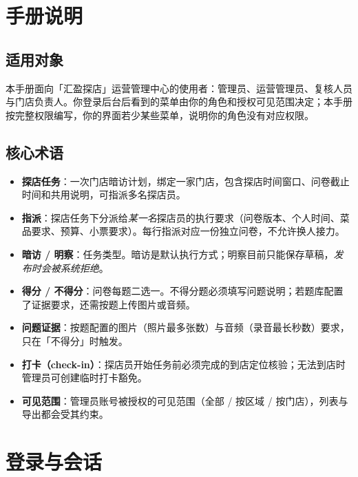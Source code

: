 \documentclass[12pt,a4paper,fontset=none]{ctexart}
\begin{document}

\tableofcontents
\newpage

\section{手册说明}

\subsection{适用对象}
本手册面向「汇盈探店」运营管理中心的使用者：管理员、运营管理员、复核人员与门店负责人。你登录后台后看到的菜单由你的角色和授权可见范围决定；本手册按完整权限编写，你的界面若少某些菜单，说明你的角色没有对应权限。

\subsection{核心术语}
\begin{itemize}
\item \textbf{探店任务}：一次门店暗访计划，绑定一家门店，包含探店时间窗口、问卷截止时间和共用说明，可指派多名探店员。
\item \textbf{指派}：探店任务下分派给\emph{某一名}探店员的执行要求（问卷版本、个人时间、菜品要求、预算、小票要求）。每行指派对应一份独立问卷，不允许换人接力。
\item \textbf{暗访 / 明察}：任务类型。暗访是默认执行方式；明察目前只能保存草稿，\emph{发布时会被系统拒绝}。
\item \textbf{得分 / 不得分}：问卷每题二选一。不得分题必须填写问题说明；若题库配置了证据要求，还需按题上传图片或音频。
\item \textbf{问题证据}：按题配置的图片（照片最多张数）与音频（录音最长秒数）要求，只在「不得分」时触发。
\item \textbf{打卡（check-in）}：探店员开始任务前必须完成的到店定位核验；无法到店时管理员可创建临时打卡豁免。
\item \textbf{可见范围}：管理员账号被授权的可见范围（全部 / 按区域 / 按门店），列表与导出都会受其约束。
\end{itemize}

\section{登录与会话}
\end{document}
